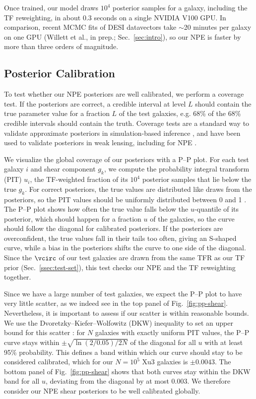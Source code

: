 Once trained, our model draws $10^4$ posterior samples for a galaxy, including the TF reweighting, in about 0.3 seconds on a single NVIDIA V100 GPU. In comparison, recent MCMC fits of DESI datavectors take $\sim$20 minutes per galaxy on one GPU (Willett et al., in prep.; Sec.~\ref{sec:intro}), so our NPE is faster by more than three orders of magnitude.

\subsection{Posterior Calibration}
\label{ssec:calibration}

To test whether our NPE posteriors are well calibrated, we perform a coverage test. If the posteriors are correct, a credible interval at level $L$ should contain the true parameter value for a fraction $L$ of the test galaxies, e.g. 68\% of the 68\% credible intervals should contain the truth. Coverage tests are a standard way to validate approximate posteriors in simulation-based inference \citep{TrustCrisis}, and have been used to validate posteriors in weak lensing, including for NPE \citep{FieldLevelWL, NPEShear}.

We visualize the global coverage of our posteriors with a P--P plot. For each test galaxy $i$ and shear component $g_k$, we compute the probability integral transform (PIT) $u_i$, the TF-weighted fraction of its $10^4$ posterior samples that lie below the true $g_k$. For correct posteriors, the true values are distributed like draws from the posteriors, so the PIT values should be uniformly distributed between 0 and 1 \citep{CookGelmanRubin06, SBC}. The P--P plot shows how often the true value falls below the $u$-quantile of its posterior, which should happen for a fraction $u$ of the galaxies, so the curve should follow the diagonal for calibrated posteriors. If the posteriors are overconfident, the true values fall in their tails too often, giving an S-shaped curve, while a bias in the posteriors shifts the curve to one side of the diagonal. Since the $\vcirc$ of our test galaxies are drawn from the same TFR as our TF prior (Sec.~\ref{ssec:test-set}), this test checks our NPE and the TF reweighting together.

Since we have a large number of test galaxies, we expect the P--P plot to have very little scatter, as we indeed see in the top panel of Fig.~\ref{fig:pp-shear}. Nevertheless, it is important to assess if our scatter is within reasonable bounds. We use the Dvoretzky--Kiefer--Wolfowitz (DKW) inequality to set an upper bound for this scatter \citep{DKW56, Massart90}: for $N$ galaxies with exactly uniform PIT values, the P--P curve stays within $\pm\sqrt{\ln(2/0.05)/2N}$ of the diagonal for all $u$ with at least 95\% probability. This defines a band within which our curve should stay to be considered calibrated, which for our $N=10^5$ Xu3 galaxies is $\pm 0.0043$. The bottom panel of Fig.~\ref{fig:pp-shear} shows that both curves stay within the DKW band for all $u$, deviating from the diagonal by at most 0.003. We therefore consider our NPE shear posteriors to be well calibrated globally.

